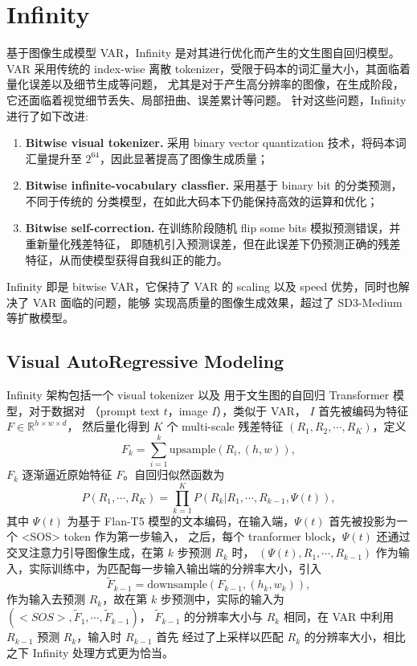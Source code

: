 \section{Infinity}

基于图像生成模型 VAR，Infinity 是对其进行优化而产生的文生图自回归模型。
VAR 采用传统的 index-wise 离散 tokenizer，受限于码本的词汇量大小，其面临着量化误差以及细节生成等问题，
尤其是对于产生高分辨率的图像，在生成阶段，它还面临着视觉细节丢失、局部扭曲、误差累计等问题。
针对这些问题，Infinity 进行了如下改进:
\begin{enumerate}
    \item \textbf{Bitwise visual tokenizer.} 采用 binary vector quantization 技术，将码本词汇量提升至
    $2^{64}$，因此显著提高了图像生成质量；
    \item \textbf{Bitwise infinite-vocabulary classfier.} 采用基于 binary bit 的分类预测，不同于传统的
    分类模型，在如此大码本下仍能保持高效的运算和优化；
    \item \textbf{Bitwise self-correction.} 在训练阶段随机 flip some bits 模拟预测错误，并重新量化残差特征，
    即随机引入预测误差，但在此误差下仍预测正确的残差特征，从而使模型获得自我纠正的能力。 
\end{enumerate}
Infinity 即是 bitwise VAR，它保持了 VAR 的 scaling 以及 speed 优势，同时也解决了 VAR 面临的问题，能够
实现高质量的图像生成效果，超过了 SD3-Medium 等扩散模型。

\subsection{Visual AutoRegressive Modeling}
Infinity 架构包括一个 visual tokenizer 以及 用于文生图的自回归 Transformer 模型，对于数据对
（prompt text $t$，image $I$），类似于 VAR， $I$ 首先被编码为特征 $F\in\mathbb{R}^{h\times w\times d}$，
然后量化得到 $K$ 个 multi-scale 残差特征 $(R_1, R_2, \cdots, R_K)$，定义
\begin{equation}
    F_k = \sum_{i=1}^{k} \text{upsample}(R_i,(h,w)),
\end{equation}
$F_k$ 逐渐逼近原始特征 $F$。自回归似然函数为
\begin{equation}
    P(R_1,\cdots,R_K) = \prod_{k=1}^K P(R_k|R_1,\cdots,R_{k-1},\Psi(t)),
\end{equation}
其中 $\Psi(t)$ 为基于 Flan-T5 模型的文本编码，在输入端，$\Psi(t)$ 首先被投影为一个 <SOS> token 作为第一步输入，
之后，每个 tranformer block，$\Psi(t)$ 还通过交叉注意力引导图像生成，在第 $k$ 步预测 $R_k$ 时，
$(\Psi(t),R_1,\cdots,R_{k-1})$ 作为输入，实际训练中，为匹配每一步输入输出端的分辨率大小，引入
\begin{equation}
    \tilde{F}_{k-1} = \text{downsample}(F_{k-1},(h_k,w_k)),
\end{equation}
作为输入去预测 $R_k$，故在第 $k$ 步预测中，实际的输入为 $(<SOS>,\tilde{F}_1,\cdots,\tilde{F}_{k-1})$，
$\tilde{F}_{k-1}$ 的分辨率大小与 $R_k$ 相同，在 VAR 中利用 $R_{k-1}$ 预测 $R_k$，输入时 $R_{k-1}$ 首先
经过了上采样以匹配 $R_k$ 的分辨率大小，相比之下 Infinity 处理方式更为恰当。

